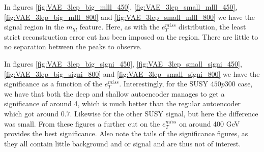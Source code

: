 In figures \ref{fig:VAE_3lep_big_mlll_450}, \ref{fig:VAE_3lep_small_mlll_450}, 
\ref{fig:VAE_3lep_big_mlll_800} and  \ref{fig:VAE_3lep_small_mlll_800} we have the signal 
region in the $m_{lll}$ feature. Here, as with the $e_T^{miss}$ distribution, the least 
strict reconstruction error cut has been imposed on the region. There are little to no separation between the peaks 
to observe. \par 

In figures \ref{fig:VAE_3lep_big_signi_450}, \ref{fig:VAE_3lep_small_signi_450}, \ref{fig:VAE_3lep_big_signi_800} and  
\ref{fig:VAE_3lep_small_signi_800} we have the significance as a function of the $e_T^{miss}$.
Interestingly, for the SUSY $450p300$ case, we have that both the deep and shallow 
autoencoder manages to get a significance of around 4, which is much better than the 
regular autoencoder which got around 0.7. Likewise for the other SUSY signal, but 
here the difference was small. From these figures a further cut on the 
$e_T^{miss}$ on around 400 GeV provides the best significance. Also note the tails of 
the significance figures, as they all contain little background and or signal and are 
thus not of interest. 


